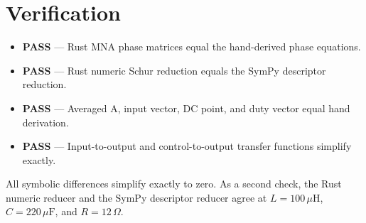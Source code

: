 \documentclass[11pt]{article}
\begin{document}
\section*{Verification}
\begin{itemize}
\item \textbf{PASS} --- Rust MNA phase matrices equal the hand-derived phase equations.
\item \textbf{PASS} --- Rust numeric Schur reduction equals the SymPy descriptor reduction.
\item \textbf{PASS} --- Averaged A, input vector, DC point, and duty vector equal hand derivation.
\item \textbf{PASS} --- Input-to-output and control-to-output transfer functions simplify exactly.
\end{itemize}
All symbolic differences simplify exactly to zero. As a second check, the
Rust numeric reducer and the SymPy descriptor reducer agree at
$L=100\,\mu\mathrm{H}$, $C=220\,\mu\mathrm{F}$, and $R=12\,\Omega$.
\end{document}
